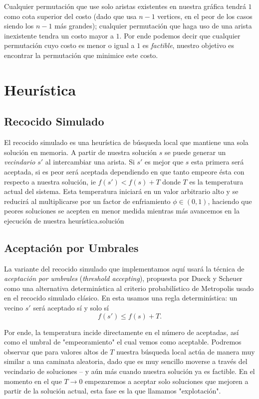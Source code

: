 \documentclass[11pt,letterpaper]{article}
\begin{document}
Cualquier permutación que use solo aristas existentes en nuestra gráfica tendrá $1$ como cota superior del costo (dado que usa $n-1$ vertices, en el peor de los casos siendo los $n-1$ más grandes); cualquier permutación que haga uso de una arista inexistente tendra un costo mayor a $1$. Por ende podemos decir que cualquier permutación cuyo costo es menor o igual a $1$ es \emph{factible}, nuestro objetivo es encontrar la permutación que minimice este costo.

\section{Heurística}

\subsection{Recocido Simulado}

El recocido simulado es una heurística de búsqueda local que mantiene una sola solución en memoria. A partir de nuestra solución $s$ se puede generar un \emph{vecindario} $s'$ al intercambiar una arista. Si $s'$ es mejor que $s$ esta primera será aceptada, si es peor será aceptada dependiendo en que tanto empeore ésta con respecto a nuestra solución, ie $f(s') < f(s) + T$ donde $T$ es la temperatura actual del sistema. Esta temperatura iniciará en un valor arbitrario alto y se reducirá al multiplicarse por un factor de enfriamiento $\phi \in (0,1)$, haciendo que peores soluciones se acepten en menor medida mientras más avancemos en la ejecución de nuestra heurística.solución

\subsection{Aceptación por Umbrales}

La variante del recocido simulado que implementamos aquí usará la técnica de \emph{aceptación por umbrales} (\emph{threshold accepting}), propuesta por Dueck y Scheuer \cite{dueck1990} como una alternativa determinística al criterio probabilístico de Metropolis usado en el recocido simulado clásico. En esta usamos una regla determinística: un vecino $s'$ será aceptado sí y solo sí
\begin{equation}
  f(s') \le f(s) + T.
  \label{eq:threshold}
\end{equation}

Por ende, la temperatura incide directamente en el número de aceptadas, así como el umbral de "empeoramiento" el cual vemos como aceptable. Podremos observar que para valores altos de $T$ nuestra búsqueda local actúa de manera muy similar a una caminata aleatoria, dado que es muy sencillo moverse a través del vecindario de soluciones – y aún más cuando nuestra solución ya es factible. En el momento en el que $T \to 0$ empezaremos a aceptar solo soluciones que mejoren a partir de la solución actual, esta fase es la que llamamos "explotación".
\end{document}

